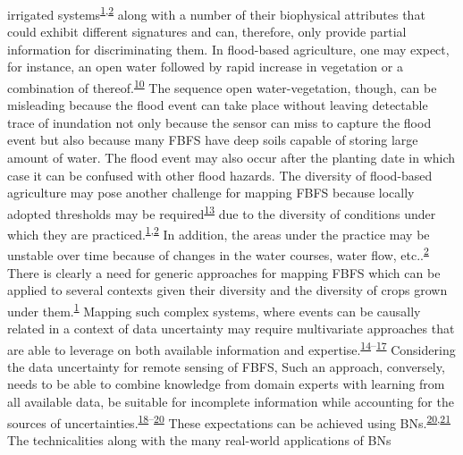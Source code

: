\documentclass[12pt,oneside]{article}
\begin{document}
irrigated
systems\textsuperscript{\protect\hyperlink{ref-Puertas_et_al_2011}{1},\protect\hyperlink{ref-VanSteenbergen_et_al_2010}{2}}
along with a number of their biophysical attributes that could exhibit
different signatures and can, therefore, only provide partial
information for discriminating them. In flood-based agriculture, one may
expect, for instance, an open water followed by rapid increase in
vegetation or a combination of
thereof.\textsuperscript{\protect\hyperlink{ref-Boschetti_et_al_2014}{10}}
The sequence open water-vegetation, though, can be misleading because
the flood event can take place without leaving detectable trace of
inundation not only because the sensor can miss to capture the flood
event but also because many FBFS have deep soils capable of storing
large amount of water. The flood event may also occur after the planting
date in which case it can be confused with other flood hazards. The
diversity of flood-based agriculture may pose another challenge for
mapping FBFS because locally adopted thresholds may be
required\textsuperscript{\protect\hyperlink{ref-Bashari_et_al_2008}{13}}
due to the diversity of conditions under which they are
practiced.\textsuperscript{\protect\hyperlink{ref-Puertas_et_al_2011}{1},\protect\hyperlink{ref-VanSteenbergen_et_al_2010}{2}}
In addition, the areas under the practice may be unstable over time
because of changes in the water courses, water flow,
etc..\textsuperscript{\protect\hyperlink{ref-VanSteenbergen_et_al_2010}{2}}
There is clearly a need for generic approaches for mapping FBFS which
can be applied to several contexts given their diversity and the
diversity of crops grown under
them.\textsuperscript{\protect\hyperlink{ref-Puertas_et_al_2011}{1}}
Mapping such complex systems, where events can be causally related in a
context of data uncertainty may require multivariate approaches that are
able to leverage on both available information and
expertise.\textsuperscript{\protect\hyperlink{ref-Hubbard_2014}{14}--\protect\hyperlink{ref-Whitney_et_al_2018}{17}}
Considering the data uncertainty for remote sensing of FBFS, Such an
approach, conversely, needs to be able to combine knowledge from domain
experts with learning from all available data, be suitable for
incomplete information while accounting for the sources of
uncertainties.\textsuperscript{\protect\hyperlink{ref-Kuhnert_2011}{18}--\protect\hyperlink{ref-Whitney_et_al_2018a}{20}}
These expectations can be achieved using
BNs.\textsuperscript{\protect\hyperlink{ref-Whitney_et_al_2018a}{20},\protect\hyperlink{ref-Yet_et_al_2016}{21}}
The technicalities along with the many real-world applications of BNs
\end{document}
